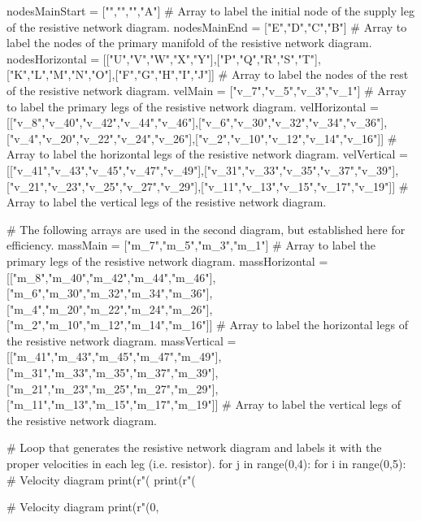 \documentclass[12pt, oneside]{article}   	%
\begin{document}
\begin{circuitikz}[font=\tiny] %

\def\hspc{3.2} %
\def\vspc{4} %

\begin{pycode}

nodesMainStart = ["","","","A"] # Array to label the initial node of the supply leg of the resistive network diagram.
nodesMainEnd = ["E","D","C","B"] # Array to label the nodes of the primary manifold of the resistive network diagram.
nodesHorizontal = [["U","V","W","X","Y"],["P","Q","R","S","T"],["K","L","M","N","O"],["F","G","H","I","J"]] # Array to label the nodes of the rest of the resistive network diagram.
velMain = ["v_7","v_5","v_3","v_1"] # Array to label the primary legs of the resistive network diagram.
velHorizontal = [["v_8","v_40","v_42","v_44","v_46"],["v_6","v_30","v_32","v_34","v_36"],["v_4","v_20","v_22","v_24","v_26"],["v_2","v_10","v_12","v_14","v_16"]] # Array to label the horizontal legs of the resistive network diagram.
velVertical = [["v_41","v_43","v_45","v_47","v_49"],["v_31","v_33","v_35","v_37","v_39"],["v_21","v_23","v_25","v_27","v_29"],["v_11","v_13","v_15","v_17","v_19"]] # Array to label the vertical legs of the resistive network diagram.

# The following arrays are used in the second diagram, but established here for efficiency.
massMain = ["m_7","m_5","m_3","m_1"]  # Array to label the primary legs of the resistive network diagram.
massHorizontal = [["m_8","m_40","m_42","m_44","m_46"],["m_6","m_30","m_32","m_34","m_36"],["m_4","m_20","m_22","m_24","m_26"],["m_2","m_10","m_12","m_14","m_16"]] # Array to label the horizontal legs of the resistive network diagram.
massVertical = [["m_41","m_43","m_45","m_47","m_49"],["m_31","m_33","m_35","m_37","m_39"],["m_21","m_23","m_25","m_27","m_29"],["m_11","m_13","m_15","m_17","m_19"]] # Array to label the vertical legs of the resistive network diagram.

# Loop that generates the resistive network diagram and labels it with the proper velocities in each leg (i.e. resistor).
for j in range(0,4):
    for i in range(0,5):
        # Velocity diagram
        print(r"\draw (%
        print(r"\draw (%
        
    # Velocity diagram
    print(r"\draw (0,%

\end{pycode}

\end{circuitikz}
\end{document}
